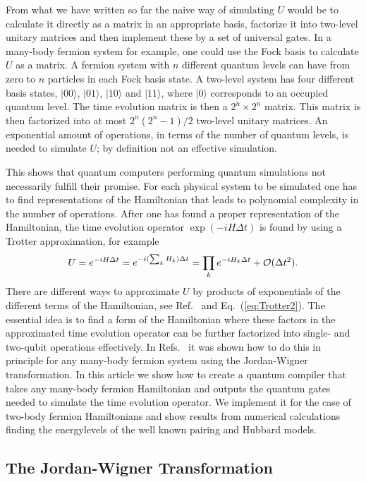 From what we have written so far
the naive way of simulating $U$ would be to calculate it directly as
a matrix in an appropriate basis, factorize it into two-level unitary
matrices and then implement these by a set of universal gates. 
In a many-body fermion system for example, one could use the Fock basis to
calculate $U$ as a matrix.  A fermion system with $n$ different
quantum levels can have from zero to $n$ particles in each Fock basis
state. A 
two-level system has four different basis states, $|00\rangle$,
$|01\rangle$, $|10\rangle$ and $|11\rangle$, where $|0\rangle$ corresponds to an
occupied quantum level.  The time evolution matrix is then a $2^n\times
2^n$ matrix.  This matrix is then factorized into at most
$2^n(2^n-1)/2$ two-level unitary matrices. An exponential
amount of operations, in terms of the number of quantum levels, is
needed to simulate $U$; by definition not an effective simulation.


This shows that quantum computers performing quantum
simulations not necessarily fulfill their promise. For each physical
system to be simulated one has to find  representations of the
Hamiltonian that leads to polynomial complexity in the number of
operations. After one has found a proper representation of the
Hamiltonian, the time evolution operator $\exp(-iH\Delta t)$ is found by using a 
Trotter approximation, for example 
\begin{equation}
\label{eq:Trotter1}
U=e^{-iH\Delta t}=e^{-i(\sum_k H_k) \Delta t} = \prod_k e^{-iH_k\Delta
  t} + {\cal O}(\Delta t^2).
\end{equation}
There are different ways to approximate $U$ by products of 
exponentials of the different terms of the Hamiltonian, see
Ref.~\cite{nielsen2000} and Eq.~(\ref{eq:Trotter2}). The essential 
idea is to find a form of the Hamiltonian where these factors in the
approximated time evolution operator can be further
factorized into single- and two-qubit operations effectively. 
In
Refs.~\cite{ortiz2001,ortiz2002}
it was shown how to do this in principle for
any many-body fermion system using the Jordan-Wigner transformation.
In this article we 
show how to create a quantum  compiler that takes
any many-body fermion Hamiltonian and outputs the quantum gates needed
to simulate the time evolution operator. We implement it for the case
of two-body fermion Hamiltonians and show results from numerical
calculations finding the energylevels of the well known pairing and
Hubbard models.


\subsection{The Jordan-Wigner Transformation}

